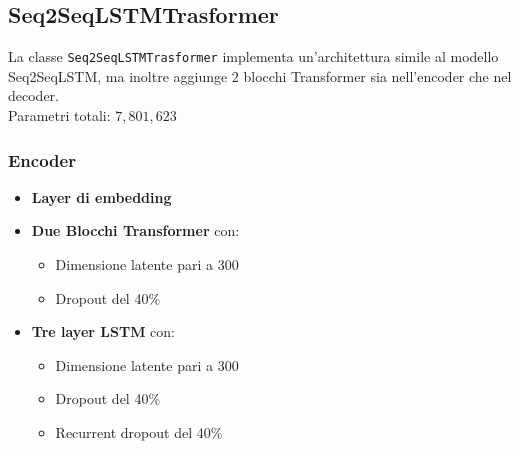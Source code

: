\subsection{Seq2SeqLSTMTrasformer}
La classe \texttt{Seq2SeqLSTMTrasformer} implementa un'architettura simile al modello Seq2SeqLSTM, ma inoltre aggiunge \(2\) blocchi Transformer sia nell'encoder che nel decoder.\\
Parametri totali: \(7,801,623\)\\
\subsubsection{Encoder}
\begin{itemize}
    \item \textbf{Layer di embedding}
    \item \textbf{Due Blocchi Transformer} con:
        \begin{itemize}
            \item Dimensione latente pari a 300
            \item Dropout del 40\%
        \end{itemize}
    \item \textbf{Tre layer LSTM} con:
    \begin{itemize}
        \item Dimensione latente pari a 300
        \item Dropout del 40\%
        \item Recurrent dropout del 40\%
    \end{itemize}
\end{itemize}

